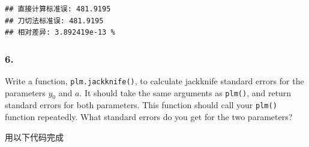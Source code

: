 \documentclass[
]{article}
\newenvironment{Shaded}{\begin{snugshade}}{\end{snugshade}}
\newcommand{\AttributeTok}[1]{\textcolor[rgb]{0.13,0.29,0.53}{#1}}
\newcommand{\CommentTok}[1]{\textcolor[rgb]{0.56,0.35,0.01}{\textit{#1}}}
\newcommand{\ControlFlowTok}[1]{\textcolor[rgb]{0.13,0.29,0.53}{\textbf{#1}}}
\newcommand{\DecValTok}[1]{\textcolor[rgb]{0.00,0.00,0.81}{#1}}
\newcommand{\FloatTok}[1]{\textcolor[rgb]{0.00,0.00,0.81}{#1}}
\newcommand{\FunctionTok}[1]{\textcolor[rgb]{0.13,0.29,0.53}{\textbf{#1}}}
\newcommand{\NormalTok}[1]{#1}
\newcommand{\OtherTok}[1]{\textcolor[rgb]{0.56,0.35,0.01}{#1}}
\newcommand{\SpecialCharTok}[1]{\textcolor[rgb]{0.81,0.36,0.00}{\textbf{#1}}}
\begin{document}
\begin{verbatim}
## 直接计算标准误: 481.9195 
## 刀切法标准误: 481.9195 
## 相对差异: 3.892419e-13 %
\end{verbatim}

\subsubsection{6.}\label{section-4}

Write a function, \texttt{plm.jackknife()}, to calculate jackknife
standard errors for the parameters \(y_0\) and \(a\). It should take the
same arguments as \texttt{plm()}, and return standard errors for both
parameters. This function should call your \texttt{plm()} function
repeatedly. What standard errors do you get for the two parameters?

用以下代码完成

\begin{Shaded}
\end{Shaded}
\end{document}
